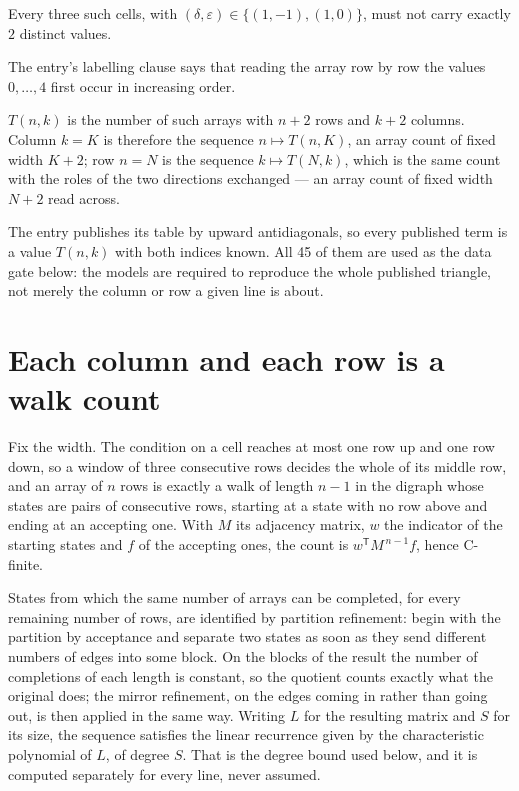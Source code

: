 \documentclass[11pt]{article}
\theoremstyle{definition}
\begin{document}
Every three such cells, with $(\delta,\varepsilon) \in \{(1,-1), (1,0)\}$, must not carry exactly $2$ distinct values.

The entry's labelling clause says that reading the array row by row the values $0,\dots,4$ first occur in increasing order.

$T(n,k)$ is the number of such arrays with $n + 2$ rows and $k + 2$ columns. Column $k = K$ is therefore the sequence $n \mapsto T(n,K)$, an array count of fixed width $K + 2$; row $n = N$ is the sequence $k \mapsto T(N,k)$, which is the same count with the roles of the two directions exchanged --- an array count of fixed width $N + 2$ read across.

The entry publishes its table by upward antidiagonals, so every published term is a value $T(n,k)$ with both indices known. All 45 of them are used as the data gate below: the models are required to reproduce the whole published triangle, not merely the column or row a given line is about.

\section{Each column and each row is a walk count}

Fix the width. The condition on a cell reaches at most one row up and one row down, so a window of three consecutive rows decides the whole of its middle row, and an array of $n$ rows is exactly a walk of length $n-1$ in the digraph whose states are pairs of consecutive rows, starting at a state with no row above and ending at an accepting one. With $M$ its adjacency matrix, $w$ the indicator of the starting states and $f$ of the accepting ones, the count is $w^{\mathsf T}M^{\,n-1}f$, hence C-finite.

States from which the same number of arrays can be completed, for every remaining number of rows, are identified by partition refinement: begin with the partition by acceptance and separate two states as soon as they send different numbers of edges into some block. On the blocks of the result the number of completions of each length is constant, so the quotient counts exactly what the original does; the mirror refinement, on the edges coming in rather than going out, is then applied in the same way. Writing $L$ for the resulting matrix and $S$ for its size, the sequence satisfies the linear recurrence given by the characteristic polynomial of $L$, of degree $S$. That is the degree bound used below, and it is computed separately for every line, never assumed.
\end{document}
